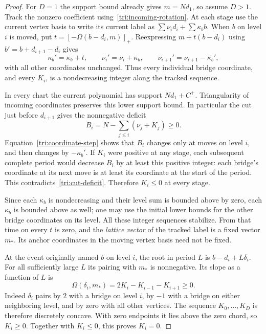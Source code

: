 \begin{proof}
For $D=1$ the support bound already gives $m=Nd_1$, so assume $D>1$.
Track the nonzero coefficient using~\eqref{tri:incoming-rotation}.
At each stage use the current vertex basis to write its current label
as $\sum\nu_i d_i+\sum\kappa_b b$.
When $b$ on level $i$ is moved, put
$t=[-\Omega(b-d_i,m)]_+$.  Reexpressing
$m+t(b-d_i)$ using $b'=b+d_{i+1}-d_i$ gives
\begin{equation}\label{tri:coordinate-step}
 \kappa_b'=\kappa_b+t,\qquad
 \nu_i'=\nu_i+\kappa_b,\qquad
 \nu_{i+1}'=\nu_{i+1}-\kappa_b',
\end{equation}
with all other coordinates unchanged.
Thus every individual bridge coordinate, and every $K_i$, is a
nondecreasing integer along the tracked sequence.

In every chart the current polynomial has support
$Nd_1+C^+$.  Triangularity of incoming coordinates preserves this
lower support bound.  In particular the cut just before $d_{i+1}$
gives the nonnegative deficit
\begin{equation}\label{tri:cut-deficit}
 B_i=N-\sum_{j\leq i}(\nu_j+K_j)\geq0.
\end{equation}
Equation~\eqref{tri:coordinate-step} shows that $B_i$ changes only at
moves on level $i$, and then changes by $-\kappa_b'$.
If $K_i$ were positive at any stage, each subsequent complete period
would decrease $B_i$ by at least this positive integer: each bridge's
coordinate at its next move is at least its coordinate at the start
of the period.  This contradicts~\eqref{tri:cut-deficit}.  Therefore
$K_i\leq0$ at every stage.

Since each $\kappa_b$ is nondecreasing and their level sum is bounded
above by zero, each $\kappa_b$ is bounded above as well; one may use
the initial lower bounds for the other bridge coordinates on its
level.  All these integer sequences stabilize.  From that time on
every $t$ is zero, and the \emph{lattice vector} of the tracked label
is a fixed vector $m_*$.  Its anchor coordinates in the moving
vertex basis need not be fixed.

At the event originally named $b$ on level $i$, the root in period
$L$ is $b-d_i+L\delta_i$.  For all sufficiently large $L$ its pairing
with $m_*$ is nonnegative.  Its slope as a function of $L$ is
\begin{equation}\label{tri:concavity}
 \Omega(\delta_i,m_*)=2K_i-K_{i-1}-K_{i+1}\geq0.
\end{equation}
Indeed $\delta_i$ pairs by $2$ with a bridge on level $i$, by $-1$
with a bridge on either neighboring level, and by zero with all
other vertices.  The sequence $K_0,\ldots,K_D$ is therefore discretely
concave.  With zero endpoints it lies above the zero chord, so
$K_i\geq0$.  Together with $K_i\leq0$, this proves $K_i=0$.


\end{proof}

